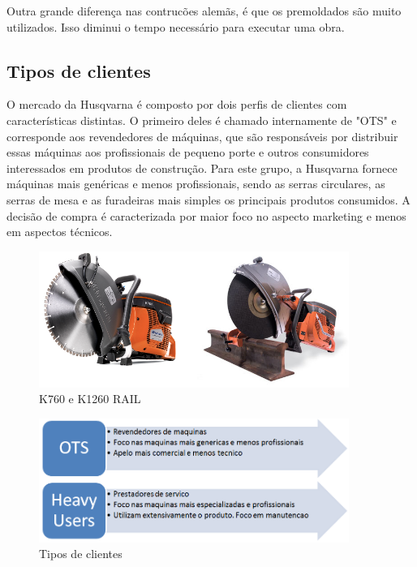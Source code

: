 \documentclass[12pt]{article}
\begin{document}
Outra grande diferença nas contrucões alemãs, é que os premoldados são muito utilizados. Isso diminui o tempo necessário para executar uma obra.

\subsection{Tipos de clientes}


	O mercado da Husqvarna é composto por dois perfis de clientes com características distintas. O primeiro deles é chamado internamente de "OTS" e corresponde aos revendedores de máquinas, que são responsáveis por distribuir essas máquinas aos profissionais de pequeno porte e outros consumidores interessados em produtos de construção. Para este grupo, a Husqvarna fornece máquinas mais genéricas e menos profissionais, sendo as serras circulares, as serras de mesa e as furadeiras mais simples os principais produtos consumidos. A decisão de compra é caracterizada por maior foco no aspecto marketing e menos em aspectos técnicos.

\begin{figure}[h!]
	\centering
	\includegraphics[width=0.9\textwidth]{img/k760-vs-k1260rail.png}
	\caption{K760 e K1260 RAIL}
	\label{fig:k700vsk1260}
\end{figure}

\begin{figure}[h!]
	\centering
	\includegraphics[width=0.9\textwidth]{img/clientes.png}
	\caption{Tipos de clientes}
	\label{fig:tipo-clientes}
\end{figure}
\end{document}
